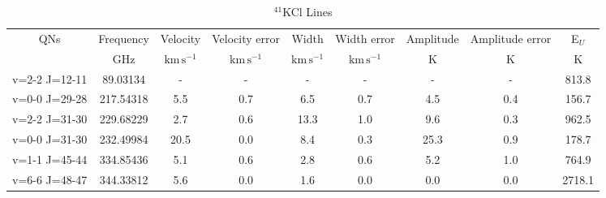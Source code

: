 \begin{table*}[htp]
\centering
\caption{$^{41}$KCl Lines}
\begin{tabular}{ccccccccc}
\label{tab:41KCl_salt_lines}
QNs & Frequency & Velocity & Velocity error & Width & Width error & Amplitude & Amplitude error & E$_U$ \\
 & $\mathrm{GHz}$ & $\mathrm{km\,s^{-1}}$ & $\mathrm{km\,s^{-1}}$ & $\mathrm{km\,s^{-1}}$ & $\mathrm{km\,s^{-1}}$ & $\mathrm{K}$ & $\mathrm{K}$ & $\mathrm{K}$ \\
\hline
v=2-2 J=12-11 & 89.03134 & - & - & - & - & - & - & 813.8 \\
v=0-0 J=29-28 & 217.54318 & 5.5 & 0.7 & 6.5 & 0.7 & 4.5 & 0.4 & 156.7 \\
v=2-2 J=31-30 & 229.68229 & 2.7 & 0.6 & 13.3 & 1.0 & 9.6 & 0.3 & 962.5 \\
v=0-0 J=31-30 & 232.49984 & 20.5 & 0.0 & 8.4 & 0.3 & 25.3 & 0.9 & 178.7 \\
v=1-1 J=45-44 & 334.85436 & 5.1 & 0.6 & 2.8 & 0.6 & 5.2 & 1.0 & 764.9 \\
v=6-6 J=48-47 & 344.33812 & 5.6 & 0.0 & 1.6 & 0.0 & 0.0 & 0.0 & 2718.1 \\
\hline
\end{tabular}

\par 
\end{table*}
